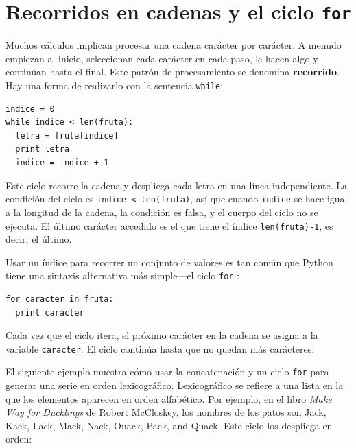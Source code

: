 

\section{Recorridos en cadenas y el ciclo \texttt{for}}
\label{for}

Muchos cálculos implican procesar una cadena carácter por carácter. A 
menudo empiezan al inicio, seleccionan cada carácter en cada paso,
le hacen algo y continúan hasta el final. Este patrón de procesamiento
se denomina  {\bf recorrido}. Hay una forma de realizarlo con la
sentencia \texttt{while}:

\pagebreak
{}
\beforeverb
\begin{verbatim}
indice = 0
while indice < len(fruta):
  letra = fruta[indice]
  print letra
  indice = indice + 1
\end{verbatim}
\afterverb
%
Este ciclo recorre la cadena y despliega cada letra en una línea
independiente. La condición del ciclo es \texttt{indice < len(fruta)}, así
que cuando \texttt{indice} se hace igual a la longitud de la cadena,
la condición es falsa, y el cuerpo del ciclo no se ejecuta. El 
último carácter accedido es el que tiene el índice \texttt{len(fruta)-1},
es decir, el último.

Usar un índice para recorrer un conjunto de valores es tan común
que Python tiene una sintaxis alternativa más simple---el ciclo \texttt{for} :

\beforeverb
\begin{verbatim}
for caracter in fruta:
  print carácter
\end{verbatim}
\afterverb
%

Cada vez que el ciclo itera, el próximo carácter en la cadena se asigna
a la variable \texttt{caracter}. El ciclo continúa hasta que no quedan más
carácteres.


El siguiente ejemplo muestra cómo usar la concatenación y un
ciclo  \texttt{for} para generar una serie en orden lexicográfico.
Lexicográfico se refiere a una lista en la que los elementos
aparecen en orden alfabético. Por ejemplo, en el libro 
{\em Make Way for Ducklings} de  Robert McCloskey,  los 
nombres de los patos son  Jack, Kack, Lack, Mack,
Nack, Ouack, Pack, and Quack.  Este ciclo los despliega
en orden:


